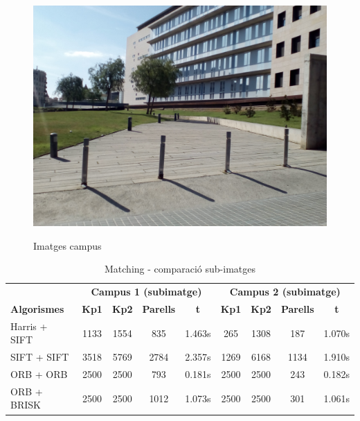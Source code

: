\begin{figure}[!htb]
				\label{fig:awesome_image3}
			\endminipage\hfill
				\includegraphics[width=\linewidth]{images/experiments/uni4}
				\label{fig:awesome_image3}
			\endminipage
			\caption{Imatges campus}
		\end{figure}

		\begin{table}[H]
			\begin{center}
				\begin{tabular}{l | c c c c | c c c c}
					& \multicolumn{4}{c|}{\textbf{Campus 1 (subimatge)}} & \multicolumn{4}{c}{\textbf{Campus 2 (subimatge)}} \\
					\textbf{Algorismes} & \textbf{Kp1} & \textbf{Kp2} & \textbf{Parells} & \textbf{t} & \textbf{Kp1} & \textbf{Kp2} & \textbf{Parells} & \textbf{t} \\ \hline
					Harris + SIFT & 1133 & 1554 & 835 & 1.463s & 265 & 1308 & 187 & 1.070s \\
					SIFT + SIFT & 3518 & 5769 & 2784 & 2.357s & 1269 & 6168 & 1134 & 1.910s \\
					ORB + ORB & 2500 & 2500 & 793 & 0.181s & 2500 & 2500 & 243 & 0.182s \\
					ORB + BRISK & 2500 & 2500 & 1012 & 1.073s & 2500 & 2500 & 301 & 1.061s \\
				\end{tabular}
			\end{center}
			\caption{Matching - comparació sub-imatges}
		\end{table}

